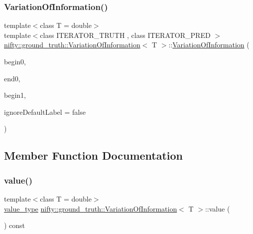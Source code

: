 \subsubsection{\texorpdfstring{Variation\+Of\+Information()}{VariationOfInformation()}}
{\footnotesize\ttfamily template$<$class T  = double$>$ \\
template$<$class I\+T\+E\+R\+A\+T\+O\+R\+\_\+\+T\+R\+U\+TH , class I\+T\+E\+R\+A\+T\+O\+R\+\_\+\+P\+R\+ED $>$ \\
\hyperlink{classnifty_1_1ground__truth_1_1VariationOfInformation}{nifty\+::ground\+\_\+truth\+::\+Variation\+Of\+Information}$<$ T $>$\+::\hyperlink{classnifty_1_1ground__truth_1_1VariationOfInformation}{Variation\+Of\+Information} (\begin{DoxyParamCaption}\item[{I\+T\+E\+R\+A\+T\+O\+R\+\_\+\+T\+R\+U\+TH}]{begin0,  }\item[{I\+T\+E\+R\+A\+T\+O\+R\+\_\+\+T\+R\+U\+TH}]{end0,  }\item[{I\+T\+E\+R\+A\+T\+O\+R\+\_\+\+P\+R\+ED}]{begin1,  }\item[{bool}]{ignore\+Default\+Label = {\ttfamily false} }\end{DoxyParamCaption})\hspace{0.3cm}{\ttfamily [inline]}}



\subsection{Member Function Documentation}
\mbox{\label{classnifty_1_1ground__truth_1_1VariationOfInformation_acad027a7f846032110241c3d842f5e06}} 
\subsubsection{\texorpdfstring{value()}{value()}}
{\footnotesize\ttfamily template$<$class T  = double$>$ \\
\hyperlink{classnifty_1_1ground__truth_1_1VariationOfInformation_ad0f4a205d57087c7641664b76410e40c}{value\+\_\+type} \hyperlink{classnifty_1_1ground__truth_1_1VariationOfInformation}{nifty\+::ground\+\_\+truth\+::\+Variation\+Of\+Information}$<$ T $>$\+::value (\begin{DoxyParamCaption}{ }\end{DoxyParamCaption}) const\hspace{0.3cm}{\ttfamily [inline]}}

